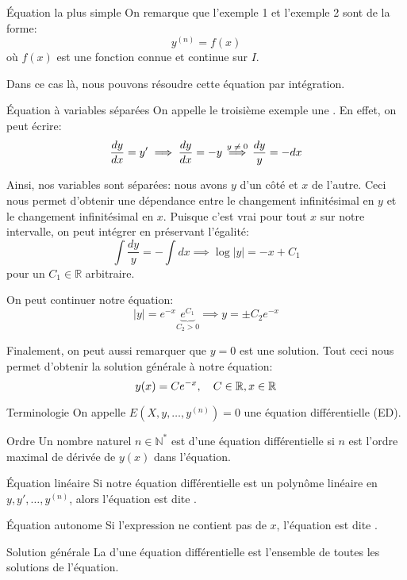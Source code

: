 \documentclass[a4paper]{article}
\begin{document}
\begin{parag}{Équation la plus simple}
    On remarque que l'exemple 1 et l'exemple 2 sont de la forme: 
    \[y^{\left(n\right)} = f\left(x\right)\]
    où $f\left(x\right)$ est une fonction connue et continue sur $I$.
    
    Dans ce cas là, nous pouvons résoudre cette équation par intégration.
\end{parag}

\begin{parag}{Équation à variables séparées}
    On appelle le troisième exemple une . En effet, on peut écrire: 
    \[\frac{dy}{dx} = y' \implies \frac{dy}{dx} = -y \over{\implies}{$y \neq 0$} \frac{dy}{y} = -dx\]

    Ainsi, nos variables sont séparées: nous avons $y$ d'un côté et $x$ de l'autre. Ceci nous permet d'obtenir une dépendance entre le changement infinitésimal en $y$ et le changement infinitésimal en $x$. Puisque c'est vrai pour tout $x$ sur notre intervalle, on peut intégrer en préservant l'égalité: 
    \[\int \frac{dy}{y} = -\int dx \implies \log\left|y\right| = -x + C_1\]
    pour un $C_1 \in \mathbb{R}$ arbitraire.

    On peut continuer notre équation:
    \[\left|y\right| = e^{-x} \underbrace{e^{C_1}}_{C_2 > 0} \implies y = \pm C_2 e^{-x}\]
    
    Finalement, on peut aussi remarquer que $y = 0$ est une solution. Tout ceci nous permet d'obtenir la solution générale à notre équation: 
    \[y\left(x\right) = Ce^{-x}, \mathspace C \in \mathbb{R}, x \in \mathbb{R}\]
\end{parag}

\begin{parag}{Terminologie}
    On appelle $E\left(X, y, \ldots, y^{\left(n\right)}\right) = 0$ une équation différentielle (ED).

    \begin{subparag}{Ordre}
        Un nombre naturel $n \in \mathbb{N}^*$ est  d'une équation différentielle si $n$ est l'ordre maximal de dérivée de $y\left(x\right)$ dans l'équation.
    \end{subparag}

    \begin{subparag}{Équation linéaire}
        Si notre équation différentielle est un polynôme linéaire en $y, y', \ldots, y^{\left(n\right)}$, alors l'équation est dite .
    \end{subparag}

    \begin{subparag}{Équation autonome}
        Si l'expression ne contient pas de $x$, l'équation est dite .
    \end{subparag}

    \begin{subparag}{Solution générale}
        La  d'une équation différentielle est l'ensemble de toutes les solutions de l'équation.
    \end{subparag}
\end{parag}
\end{document}
